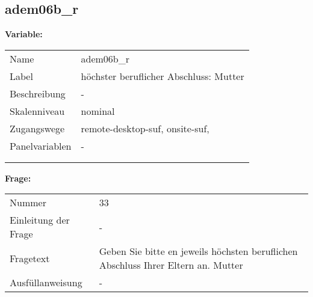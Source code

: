 	
	
	\subsection{adem06b\_r}
	\label{subSection:adem06b_r}

	\noindent\textbf{Variable:}\\
		\begin{tabular}{lL{11.3cm}}
			\label{tableVariable:adem06b_r}
			Name & adem06b\_r \\
			Label & höchster beruflicher Abschluss: Mutter \\
			Beschreibung & - \\
			Skalenniveau & nominal \\
			Zugangswege &
				remote-desktop-suf,
				onsite-suf,
 \\
			Panelvariablen & -
			 \\
			 \\
 \\
		\end{tabular}

		\vspace*{1 cm}
		\noindent\textbf{Frage:}\\
		\begin{tabular}{lL{11.3cm}}
			\label{tableQuestion:adem06b_r}
			Nummer & 33 \\
			Einleitung der Frage & - \\
			Fragetext & Geben Sie bitte en jeweils höchsten beruflichen Abschluss Ihrer Eltern an.
Mutter \\
			Ausfüllanweisung & - \\
		\end{tabular}






